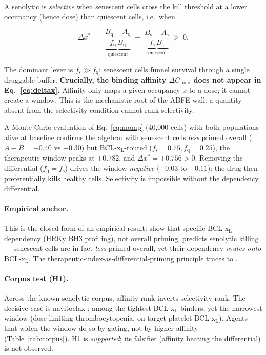 \documentclass[11pt,a4paper]{article}
\newcommand{\fs}{f_{\mathrm{s}}}
\newcommand{\fq}{f_{\mathrm{q}}}
\begin{document}
A senolytic is \emph{selective} when senescent cells cross the kill threshold
at a lower occupancy (hence dose) than quiescent cells, i.e.\ when

\begin{equation}
\Delta x^{*} \;=\; \underbrace{\frac{B_{\mathrm q}-A_{\mathrm q}}{\fq\,B_{\mathrm q}}}_{\text{quiescent}}
\;-\;
\underbrace{\frac{B_{\mathrm s}-A_{\mathrm s}}{\fs\,B_{\mathrm s}}}_{\text{senescent}}
\;>\;0 .
\label{eq:deltax}
\end{equation}

The dominant lever is $\fs\gg\fq$: senescent cells funnel survival through a
single druggable buffer. \textbf{Crucially, the binding affinity
$\Delta G_{\mathrm{bind}}$ does not appear in Eq.~\eqref{eq:deltax}.} Affinity
only maps a given occupancy $x$ to a dose; it cannot create a window. This is
the mechanistic root of the ABFE wall: a quantity absent from the selectivity
condition cannot rank selectivity.

A Monte-Carlo evaluation of Eq.~\eqref{eq:momp} (40{,}000 cells) with both
populations alive at baseline confirms the algebra: with senescent cells
\emph{less} primed overall ($A-B=-0.40$ vs $-0.30$) but BCL-x$_{\mathrm L}$-routed
($\fs=0.75,\fq=0.25$), the therapeutic window peaks at $+0.782$, and
$\Delta x^{*}=+0.756>0$. Removing the differential ($\fq=\fs$) drives the window
\emph{negative} ($-0.03$ to $-0.11$): the drug then preferentially kills healthy
cells. Selectivity is impossible without the dependency differential.

\paragraph{Empirical anchor.}
This is the closed-form of an empirical result: \citet{sotogamez2024} show that
specific BCL-x$_{\mathrm L}$ dependency (HRKy BH3 profiling), not overall
priming, predicts senolytic killing --- senescent cells are in fact \emph{less}
primed overall, yet their dependency \emph{routes onto} BCL-x$_{\mathrm L}$. The
therapeutic-index-as-differential-priming principle traces to
\citet{vo2011,montero2018}.

\paragraph{Corpus test (H1).}
Across the known senolytic corpus, affinity rank inverts selectivity rank. The
decisive case is navitoclax \citep{chang2016}: among the tightest
BCL-x$_{\mathrm L}$ binders, yet the narrowest window (dose-limiting
thrombocytopenia, on-target platelet BCL-x$_{\mathrm L}$). Agents that widen the
window do so by gating, not by higher affinity (Table~\ref{tab:corpus}). H1 is
\emph{supported}; its falsifier (affinity beating the differential) is not
observed.
\end{document}
